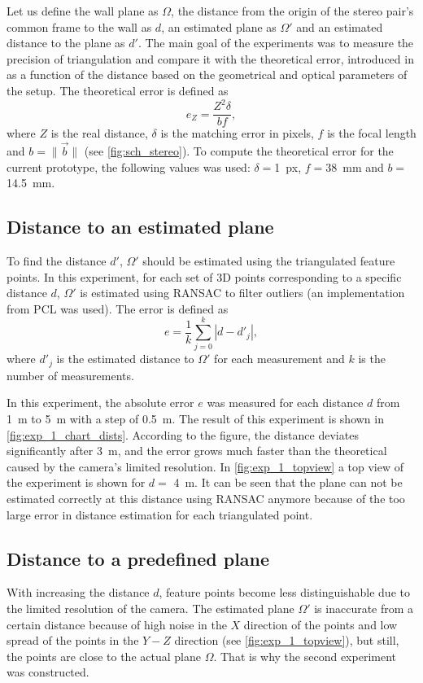 Let us define the wall plane as $\Omega$, the distance from the origin of the stereo pair's common frame to the wall as $d$, an estimated plane as $\Omega'$ and an estimated distance to the plane as $d'$.
The main goal of the experiments was to measure the precision of triangulation and compare it with the theoretical error, introduced in \cite{cv_theoretical_error} as a function of the distance based on the geometrical and optical parameters of the setup.
The theoretical error is defined as
\begin{equation}
    e_Z = \frac{Z^2 \delta}{bf},
\end{equation}
where $Z$ is the real distance, $\delta$ is the matching error in pixels, $f$ is the focal length and $b = \lVert \vec{b} \rVert$ (see \autoref{fig:sch_stereo}).
To compute the theoretical error for the current prototype, the following values was used: $\delta=$\SI{1}{px}, $f=$\SI{38}{\milli\meter} and $b=$\SI{14.5}{\milli\meter}.

\subsection{Distance to an estimated plane}
\label{sec:exp1}
To find the distance $d'$, $\Omega'$ should be estimated using the triangulated feature points.
In this experiment, for each set of 3D points corresponding to a specific distance $d$, $\Omega'$ is estimated using RANSAC to filter outliers (an implementation from PCL was used).
The error is defined as
\begin{equation}
    e = \frac{1}{k}\sum_{j=0}^{k}{|d - d'_j|},
\end{equation}
where $d'_j$ is the estimated distance to $\Omega'$ for each measurement and $k$ is the number of measurements.

In this experiment, the absolute error $e$ was measured for each distance $d$ from \SI{1}{\meter} to \SI{5}{\meter} with a step of \SI{0.5}{\meter}.
The result of this experiment is shown in \autoref{fig:exp_1_chart_dists}.
According to the figure, the distance deviates significantly after \SI{3}{\meter}, and the error grows much faster than the theoretical caused by the camera's limited resolution.
In \autoref{fig:exp_1_topview} a top view of the experiment is shown for $d=$ \SI{4}{\meter}.
It can be seen that the plane can not be estimated correctly at this distance using RANSAC anymore because of the too large error in distance estimation for each triangulated point.

\subsection{Distance to a predefined plane}
\label{sec:exp2}
With increasing the distance $d$, feature points become less distinguishable due to the limited resolution of the camera.
The estimated plane $\Omega'$ is inaccurate from a certain distance because of high noise in the $X$ direction of the points and low spread of the points in the $Y-Z$ direction (see \autoref{fig:exp_1_topview}), but still, the points are close to the actual plane $\Omega$.
That is why the second experiment was constructed.

